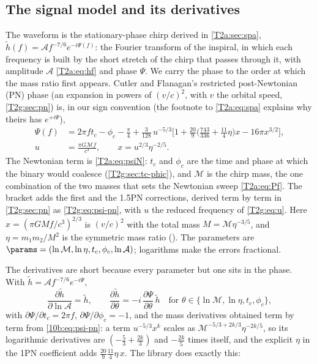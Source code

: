 \subsection{The signal model and its derivatives}
\label{10b:sec:signal-model}

The waveform is the stationary-phase chirp derived in \cref{T2a:sec:spa}, $\tilde h(f)=\mathcal Af^{-7/6}e^{-i\Psi(f)}$:
the Fourier transform of the inspiral, in which each frequency is built by the short stretch of the chirp that passes
through it, with amplitude $\mathcal A$ \eqref{T2a:eq:hf} and phase $\Psi$. We carry the phase to the order at which the mass ratio first appears. Cutler and Flanagan's restricted
post-Newtonian (PN) phase (an expansion in powers of $(v/c)^2$, with $v$ the orbital speed, \cref{T2g:sec:pn}) \cite[eq.~(42)]{CutlerFlanagan1994} is, in our sign convention (the footnote to
\cref{T2a:eq:spa} explains why theirs has $e^{+i\Psi}$),
\begin{equation}
\begin{aligned}
  \Psi(f)&=2\pi ft_c-\phi_c-\frac\pi4+\frac{3}{128}\,u^{-5/3}\Big[1+\frac{20}{9}\Big(\frac{743}{336}+\frac{11}{4}\eta\Big)x
  -16\pi x^{3/2}\Big],\\
  u&=\frac{\pi G\mathcal Mf}{c^3},\qquad x=u^{2/3}\eta^{-2/5}.
\end{aligned}
  \label{10b:eq:psi-pn}
\end{equation}
The Newtonian term is \cref{T2a:eq:psiN}: $t_c$ and $\phi_c$ are the time and phase at which the binary would
coalesce (\cref{T2g:sec:tc-phic}), and $\mathcal M$ is the chirp mass, the one combination of the two masses that
sets the Newtonian sweep \eqref{T2a:eq:Pf}. The bracket adds the first and the 1.5PN corrections, derived term by term
in \cref{T2g:sec:pn} as \eqref{T2g:eq:psi-pn}, with $u$ the reduced frequency of \eqref{T2g:eq:u}. Here
$x=(\pi GMf/c^3)^{2/3}$ is $(v/c)^2$ with the total mass $M=\mathcal M\eta^{-3/5}$, and
$\eta=m_1m_2/M^2$ is the symmetric mass ratio (). The parameters are
$\params=(\ln\mathcal M,\ln\eta,t_c,\phi_c,\ln\mathcal A)$; logarithms make the errors fractional.

The derivatives are short because every parameter but one sits in the phase. With $\tilde h=\mathcal Af^{-7/6}e^{-i\Psi}$,
\begin{equation}
  \frac{\partial\tilde h}{\partial\ln\mathcal A}=\tilde h,
  \qquad
  \frac{\partial\tilde h}{\partial\theta}=-i\,\frac{\partial\Psi}{\partial\theta}\,\tilde h
  \quad\text{for }\theta\in\{\ln\mathcal M,\ln\eta,t_c,\phi_c\},
  \label{10b:eq:derivs}
\end{equation}
with $\partial\Psi/\partial t_c=2\pi f$, $\partial\Psi/\partial\phi_c=-1$, and the mass derivatives obtained term by term
from \eqref{10b:eq:psi-pn}: a term $u^{-5/3}x^k$ scales as $\mathcal M^{-5/3+2k/3}\eta^{-2k/5}$, so its logarithmic
derivatives are $(-\tfrac53+\tfrac{2k}3)$ and $-\tfrac{2k}5$ times itself, and the explicit $\eta$ in the 1PN
coefficient adds $\tfrac{20}{9}\tfrac{11}{4}\eta\,x$. The library does exactly this:

